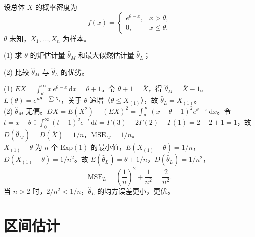 \documentclass[lang=cn,11pt]{elegantbook}
\begin{document}
\begin{exercise}\label{exer:7-shifted-exp}
设总体 \(X\) 的概率密度为
\[
f(x) = \begin{cases} e^{\theta-x}, & x > \theta, \\ 0, & x \leq \theta, \end{cases}
\]
\(\theta\) 未知，\(X_1, \dots, X_n\) 为样本。\par
(1) 求 \(\theta\) 的矩估计量 \(\hat{\theta}_M\) 和最大似然估计量 \(\hat{\theta}_L\)；\par
(2) 比较 \(\hat{\theta}_M\) 与 \(\hat{\theta}_L\) 的优劣。
\end{exercise}
\begin{solution}
(1) \(EX = \displaystyle\int_\theta^\infty x\,e^{\theta-x}\,\mathrm{d}x = \theta + 1\)。令 \(\theta+1 = \overline{X}\)，得 \(\hat{\theta}_M = \overline{X}-1\)。
\(L(\theta) = e^{n\theta-\sum X_i}\)，关于 \(\theta\) 递增（\(\theta \leq X_{(1)}\)），故 \(\hat{\theta}_L = X_{(1)}\)。\\
(2) \(\hat{\theta}_M\) 无偏。\(DX = E(X^2)-(EX)^2 = \displaystyle\int_\theta^\infty(x-\theta-1)^2e^{\theta-x}\,\mathrm{d}x\)。令 \(t=x-\theta\)：\(\displaystyle\int_0^\infty(t-1)^2e^{-t}\,\mathrm{d}t = \Gamma(3)-2\Gamma(2)+\Gamma(1) = 2-2+1 = 1\)，故 \(D(\hat{\theta}_M) = D(\overline{X}) = 1/n\)，\(\mathrm{MSE}_M = 1/n\)。\\
\(X_{(1)}-\theta\) 为 \(n\) 个 \(\mathrm{Exp}(1)\) 的最小值，\(E(X_{(1)}-\theta) = 1/n\)，\(D(X_{(1)}-\theta) = 1/n^2\)。故 \(E(\hat{\theta}_L) = \theta + 1/n\)，\(D(\hat{\theta}_L) = 1/n^2\)，
\[
\mathrm{MSE}_L = \left(\frac{1}{n}\right)^{\!2} + \frac{1}{n^2} = \frac{2}{n^2}.
\]
当 \(n > 2\) 时，\(2/n^2 < 1/n\)，\(\hat{\theta}_L\) 的均方误差更小，更优。
\end{solution}


\chapter{区间估计}
\end{document}
